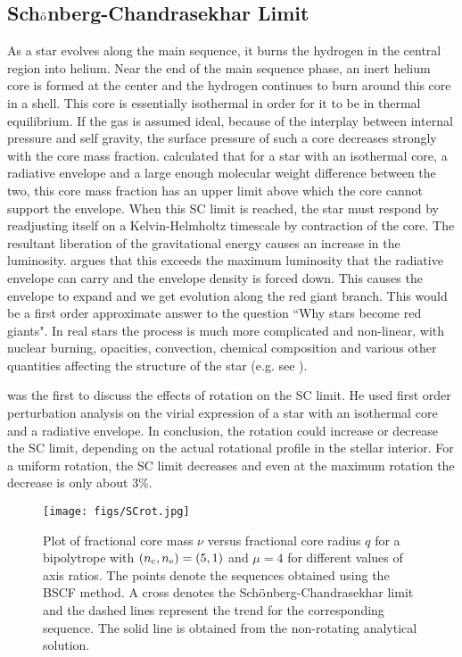 \documentclass[a4paper,fleqn,usenatbib]{mnras}
\begin{document}
\subsection{Sch$\ddot{\rm{o}}$nberg-Chandrasekhar Limit}
\label{SCL}
As a star evolves along the main sequence, it burns the hydrogen in the central region into helium. 
Near the end of the main sequence phase, an inert helium core is formed at the center and the hydrogen continues to burn around this core in a shell. This core is essentially isothermal in order for it to be in thermal equilibrium. If the gas is assumed ideal, because of the interplay between internal pressure and self gravity, the surface pressure of such a core decreases strongly with the core mass fraction. \cite{SC1942} calculated that for a star with an isothermal core, a radiative envelope and a large enough molecular weight difference between the two,  
this core mass fraction has an upper limit above which the core cannot support the envelope. 
When this SC limit is reached, the star must respond by readjusting itself on a Kelvin-Helmholtz timescale by contraction of the core. The resultant liberation of the gravitational energy causes an increase in the luminosity. 
\cite{Applegate1988} argues that this exceeds the maximum luminosity that the radiative envelope can carry and the envelope density is forced down. This causes the envelope to expand and we get evolution along the red giant branch. 
This would be a first order approximate answer to the question ``Why stars become red giants". In real stars the process is much more complicated and non-linear, with nuclear burning, opacities, convection, chemical composition and various other quantities affecting the structure of the star (e.g. see \cite{SugimotoFujimoto2000}). 


\cite{Maeder1971} was the first to discuss the effects of rotation on the SC limit.  He used first order perturbation analysis on the virial expression of a star with an isothermal core and a radiative envelope. In conclusion, the rotation could increase or decrease the SC limit, depending on the actual rotational profile in the stellar interior. For a uniform rotation, the SC limit decreases and even at the maximum rotation the decrease is only about 3\%.

\begin{figure} 
\centering
\texttt{[image: figs/SCrot.jpg]}
\caption{Plot of fractional core mass $\nu$ versus fractional core radius $q$ for a bipolytrope with $(n_{\rm c},n_{\rm e})=(5,1)$ and $\mu=4$ for different values of axis ratios. 
The points denote the sequences obtained using the BSCF method. A cross denotes the Sch$\ddot{\rm{o}}$nberg-Chandrasekhar limit and the dashed lines represent the trend for the corresponding sequence.
The solid line is obtained from the non-rotating analytical solution.}
\label{fig:nuqrot}
\end{figure}
\end{document}
